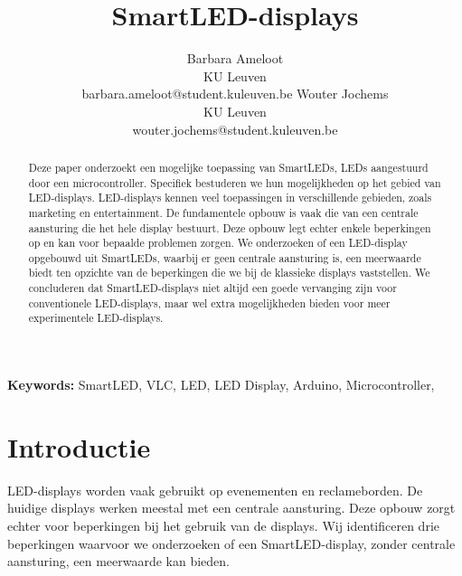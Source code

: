 \documentclass{article}
\title{SmartLED-displays}
\author{Barbara Ameloot\\
KU Leuven\\
barbara.ameloot@student.kuleuven.be
\And 
Wouter Jochems\\
KU Leuven\\
wouter.jochems@student.kuleuven.be}
\begin{document}
\fontsize{11pt}{13pt}\selectfont
\maketitle

\begin{abstract}
Deze paper onderzoekt een mogelijke toepassing van SmartLEDs, LEDs aangestuurd door een microcontroller\cite{smartLED}. Specifiek bestuderen we hun mogelijkheden op het gebied van LED-displays. LED-displays kennen veel toepassingen in verschillende gebieden, zoals marketing en entertainment. De fundamentele opbouw is vaak die van een centrale aansturing die het hele display bestuurt. Deze opbouw legt echter enkele beperkingen op en kan voor bepaalde problemen zorgen. We onderzoeken of een LED-display opgebouwd uit SmartLEDs, waarbij er geen centrale aansturing is, een meerwaarde biedt ten opzichte van de beperkingen die we bij de klassieke displays vaststellen. We concluderen dat SmartLED-displays niet altijd een goede vervanging zijn voor conventionele LED-displays, maar wel extra mogelijkheden bieden voor meer experimentele LED-displays.
\end{abstract}

{\bf Keywords:} SmartLED, VLC, LED, LED Display, Arduino, Microcontroller,


\section{Introductie}

LED-displays worden vaak gebruikt op evenementen en reclameborden. De huidige displays werken meestal met een centrale aansturing. Deze opbouw zorgt echter voor beperkingen bij het gebruik van de displays. Wij identificeren drie beperkingen waarvoor we onderzoeken of een SmartLED-display, zonder centrale aansturing, een meerwaarde kan bieden.
\end{document}
